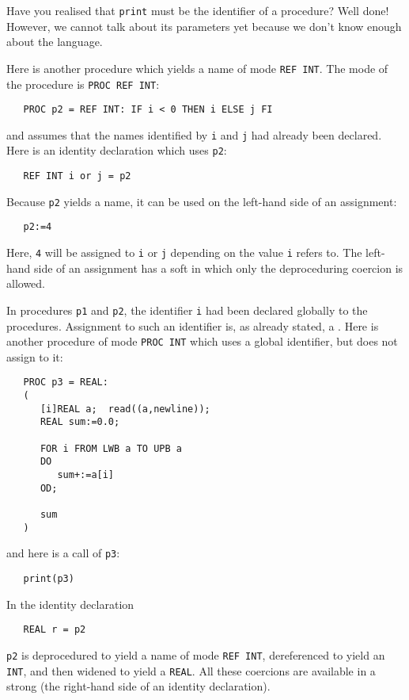 Have you realised that \verb|print| must be the identifier of a
procedure? Well done! However, we cannot talk about its parameters yet
because we don't know enough about the language.

Here is another procedure which yields a name of mode \verb|REF INT|.
The mode of the procedure is \verb|PROC REF INT|:
\begin{verbatim}
   PROC p2 = REF INT: IF i < 0 THEN i ELSE j FI
\end{verbatim}
\noindent
and assumes that the names identified by \verb|i| and \verb|j| had
already been declared. Here is an identity declaration which uses
\verb|p2|:
\begin{verbatim}
   REF INT i or j = p2
\end{verbatim}
\noindent
Because \verb|p2| yields a name, it can be used on the left-hand side
of an assignment:
\begin{verbatim}
   p2:=4
\end{verbatim}
\noindent
Here, \verb|4| will be assigned to \verb|i| or \verb|j| depending on
the value \verb|i| refers to. The left-hand side of an assignment has
a soft  in which only the deproceduring
coercion is allowed.

In procedures \verb|p1| and \verb|p2|, the identifier \verb|i| had
been declared globally to the procedures. Assignment to such an
identifier is, as already stated, a .  Here is
another procedure of mode \verb|PROC INT| which uses a global
identifier, but does not assign to it:
\begin{verbatim}
   PROC p3 = REAL:
   (
      [i]REAL a;  read((a,newline));
      REAL sum:=0.0;

      FOR i FROM LWB a TO UPB a
      DO
         sum+:=a[i]
      OD;

      sum
   )
\end{verbatim}
\noindent
and here is a call of \verb|p3|:
\begin{verbatim}
   print(p3)
\end{verbatim}
\noindent
In the identity declaration
\begin{verbatim}
   REAL r = p2
\end{verbatim}
\noindent
\verb|p2| is deprocedured to yield a name of mode \verb|REF INT|,
dereferenced to yield an \verb|INT|, and then widened to yield a
\verb|REAL|.  All these coercions are available in a strong
 (the right-hand side of an identity
declaration).

